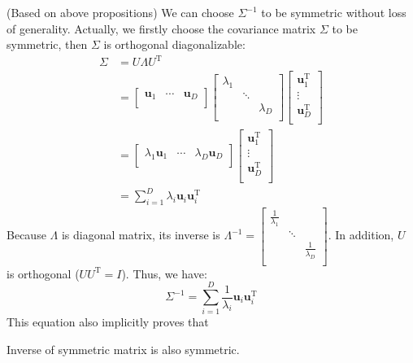 (Based on above propositions) We can choose $\Sigma^{-1}$ to be
symmetric without loss of generality. Actually, we firstly choose the
covariance matrix $\Sigma$ to be symmetric, then $\Sigma$ is
orthogonal diagonalizable:
\begin{equation}
\begin{split}
\Sigma{}&=U\Lambda{}U^{\mathrm{T}}\\
&=\begin{bmatrix}\mathbf{u}_{1}&\cdots{}&\mathbf{u}_{D}\\\end{bmatrix}\begin{bmatrix}\lambda_1&
& \\ &\ddots&\\ &
&\lambda_{D}\\\end{bmatrix}\begin{bmatrix}\mathbf{u}_{1}^{\mathrm{T}}\\\vdots{}\\\mathbf{u}_{D}^{\mathrm{T}}\\\end{bmatrix}\\
&=\begin{bmatrix}\lambda_{1}\mathbf{u}_{1}&\cdots{}&\lambda_{D}\mathbf{u}_{D}\\\end{bmatrix}\begin{bmatrix}\mathbf{u}_{1}^{\mathrm{T}}\\\vdots{}\\\mathbf{u}_{D}^{\mathrm{T}}\\\end{bmatrix}\\
&=\sum_{i=1}^{D}\lambda_{i}\mathbf{u}_{i}\mathbf{u}_{i}^{\mathrm{T}}
\end{split}
\label{eqn:factcovariance}
\end{equation}
Because $\Lambda$ is diagonal matrix, its inverse is $\Lambda^{-1}=\begin{bmatrix}\frac{1}{\lambda_{1}}& & \\ &\ddots{}& \\
        & &\frac{1}{\lambda_{D}}\\\end{bmatrix}$. 
In addition, $U$ is orthogonal ($UU^{\mathrm{T}}=I$). Thus, we have:
\begin{equation}
\Sigma^{-1}=\sum_{i=1}^{D}\frac{1}{\lambda_{i}}\mathbf{u}_{i}\mathbf{u}_{i}^{\mathrm{T}}
\label{eqn:factprecise}
\end{equation}
This equation also implicitly proves that
\begin{conclusion}
Inverse of symmetric matrix is also symmetric.
\end{conclusion}


